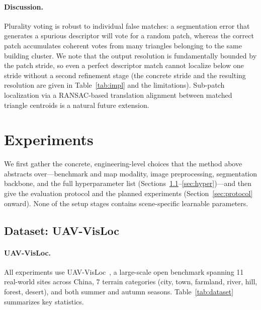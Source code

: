 \documentclass[10pt]{article}
\theoremstyle{plain}
\theoremstyle{definition}
\begin{document}
\paragraph{Discussion.}
Plurality voting is robust to individual false matches: a segmentation error
that generates a spurious descriptor will vote for a random patch, whereas
the correct patch accumulates coherent votes from many triangles belonging
to the same building cluster.
We note that the output resolution is fundamentally bounded by the patch
stride, so even a perfect descriptor match cannot localize below one stride
without a second refinement stage (the concrete stride and the resulting
resolution are given in Table~\ref{tab:impl} and the limitations).
Sub-patch localization via a RANSAC-based translation alignment between
matched triangle centroids is a natural future extension.

\section{Experiments}
\label{sec:exp}\label{sec:impl}

We first gather the concrete, engineering-level choices that the method above
abstracts over---benchmark and map modality, image preprocessing, segmentation
backbone, and the full hyperparameter list
(Sections~\ref{sec:dataset}--\ref{sec:hyper})---and then give the evaluation
protocol and the planned experiments (Section~\ref{sec:protocol} onward).
None of the setup stages contains scene-specific learnable parameters.

\subsection{Dataset: UAV-VisLoc}
\label{sec:dataset}

\paragraph{UAV-VisLoc.}
All experiments use UAV-VisLoc~\cite{uavvisloc2024}, a large-scale open
benchmark spanning 11 real-world sites across China, 7 terrain categories
(city, town, farmland, river, hill, forest, desert), and both summer and
autumn seasons.
Table~\ref{tab:dataset} summarizes key statistics.
\end{document}
